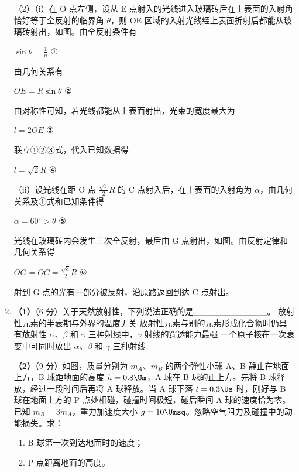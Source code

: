 \documentclass[\gkver]{gaokaozhenti}
\begin{document}
\begin{enumerate}
{（2）（i）在 O 点左侧，设从 E 点射入的光线进入玻璃砖后在上表面的入射角恰好等于全反射的临界角 $\theta$，则 OE 区域的入射光线经上表面折射后都能从玻璃砖射出，如图。由全反射条件有

$\sin\theta=\frac{1}{n}$ ①

由几何关系有

$OE=R\sin\theta$ ②

由对称性可知，若光线都能从上表面射出，光束的宽度最大为

$l=2OE$ ③


联立①②③式，代入已知数据得

$l=\sqrt{2}R$ ④

（ii）设光线在距 O 点 $\frac{\sqrt{3}}{2}R$ 的 C 点射入后，在上表面的入射角为 $\alpha$，由几何关系及①式和已知条件得

$\alpha=60^{\circ}>\theta$ ⑤

光线在玻璃砖内会发生三次全反射，最后由 G 点射出，如图。由反射定律和几何关系得


$OG=OC=\frac{\sqrt{3}}{2}R$ ⑥

射到 G 点的光有一部分被反射，沿原路返回到达 C 点射出。
}

\item
\textbf{（1）}（6 分）关于天然放射性，下列说法正确的是\_\_\_\_\_\_\_\_\_\_\_\_。
{放射性元素的半衰期与外界的温度无关}
{放射性元素与别的元素形成化合物时仍具有放射性}
{$\alpha$、$\beta$ 和 $\gamma$ 三种射线中，$\gamma$ 射线的穿透能力最强}
{一个原子核在一次衰变中可同时放出 $\alpha$、$\beta$ 和 $\gamma$ 三种射线}

\textbf{（2）}（9 分）如图，质量分别为 $m_{A}$、$m_{B}$ 的两个弹性小球 A、B 静止在地面上方，B 球距地面的高度 $h=0.8\Um$，A 球在 B 球的正上方。先将 B 球释放，经过一段时间后再将 A 球释放。当 A 球下落 $t=0.3\Us$ 时，刚好与 B 球在地面上方的 P 点处相碰，碰撞时间极短，碰后瞬间 A 球的速度恰为零。已知 $m_{B}=3m_{A}$，重力加速度大小 $g=10\Umsq$。忽略空气阻力及碰撞中的动能损失。求：
\begin{enumerate}
	\item
	B 球第一次到达地面时的速度；
	\item
	P 点距离地面的高度。
\end{enumerate}
\jdanswer{
\begin{enumerate}
	\item
	$4\Ums$


\end{enumerate}}
\end{enumerate}
\end{document}

